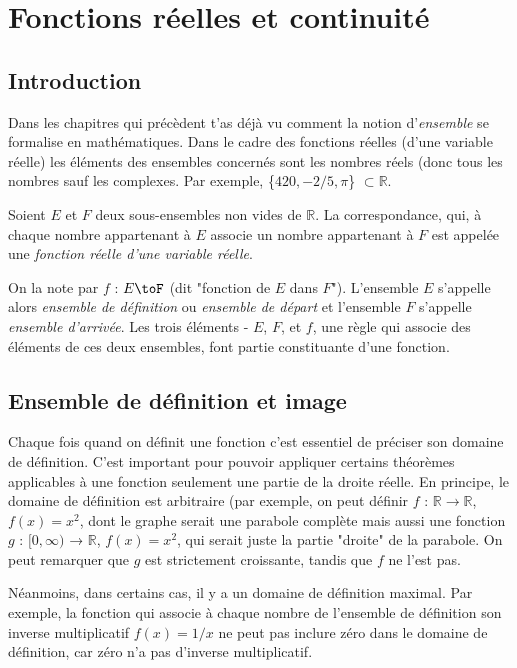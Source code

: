 \chapter{Fonctions réelles et continuité}
\section{Introduction}
Dans les chapitres qui précèdent t'as déjà vu comment la notion d'\textit{ensemble} se formalise en mathématiques. Dans le cadre des fonctions réelles (d'une variable réelle) les éléments des ensembles concernés sont les nombres réels (donc tous les nombres sauf les complexes. Par exemple, \{$420, -2/5, \pi$\} $\subset \mathbb{R}.$

\begin{boxdef}
Soient $E$  et $F$ deux sous-ensembles non vides de $\mathbb{R}$. La correspondance, qui,
à chaque nombre appartenant à $E$ associe un nombre appartenant à $F$ est appelée une \textit{fonction réelle d'une variable réelle}.
\end{boxdef}

On la note par $f$ : $E \toF$ (dit "fonction de $E$ dans $F$"). L'ensemble $E$ s'appelle alors \textit{ensemble de définition} ou \textit{ensemble de départ} et l'ensemble $F$ s'appelle \textit{ensemble d'arrivée}. Les trois éléments - $E$, $F$, et $f$, une règle qui associe des éléments de ces deux ensembles, font partie constituante d'une fonction.

\section{Ensemble de définition et image}
Chaque fois quand on définit une fonction c'est essentiel de préciser son domaine de définition. C'est important pour pouvoir appliquer certains théorèmes applicables à une fonction seulement une partie de la droite réelle. En principe, le domaine de définition est arbitraire (par exemple, on peut définir $f$ : $\mathbb{R} \to \mathbb{R}$, $f(x) = x^2$, dont le graphe serait une parabole complète mais aussi une fonction $g$ : $[0, \infty)$ → $\mathbb{R}$, $f(x) = x^2$, qui serait juste la partie "droite" de la parabole. On peut remarquer que $g$ est strictement croissante, tandis que $f$ ne l'est pas. 

Néanmoins, dans certains cas, il y a un domaine de définition maximal. Par exemple, la fonction qui associe à chaque nombre de l'ensemble de définition son inverse multiplicatif $f(x) = 1/x$ ne peut pas inclure zéro dans le domaine de définition, car zéro n'a pas d'inverse multiplicatif.

